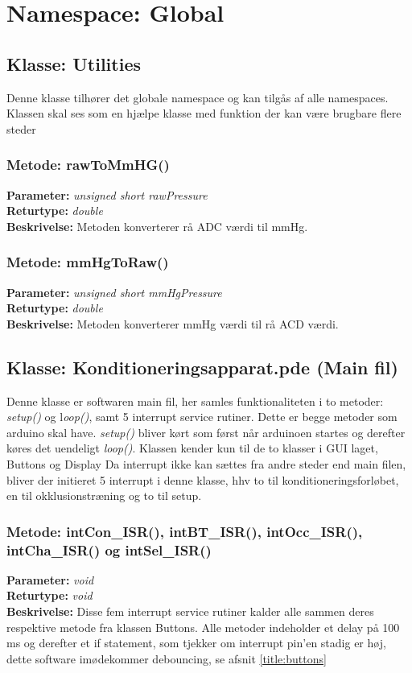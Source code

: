 \section{Namespace: Global}

\subsection{Klasse: Utilities}
Denne klasse tilhører det globale namespace og kan tilgås af alle namespaces. Klassen skal ses som en hjælpe klasse med funktion der kan være brugbare flere steder

\subsubsection{Metode: rawToMmHG()}
\textbf{Parameter: } \textit{unsigned short rawPressure}
\\ \textbf{Returtype: } \textit{double}
\\ \textbf{Beskrivelse: } Metoden konverterer rå ADC værdi til mmHg.

\subsubsection{Metode: mmHgToRaw()}
\textbf{Parameter: } \textit{unsigned short mmHgPressure}
\\ \textbf{Returtype: } \textit{double}
\\ \textbf{Beskrivelse: } Metoden konverterer mmHg værdi til rå ACD værdi.

\subsection{Klasse: Konditioneringsapparat.pde (Main fil)}
Denne klasse er softwaren main fil, her samles funktionaliteten i to metoder: \textit{setup()} og l\textit{oop()}, samt 5 interrupt service rutiner. Dette er begge metoder som arduino skal have. \textit{setup()} bliver kørt som først når arduinoen startes og derefter køres det uendeligt \textit{loop()}. Klassen kender kun til de to klasser i GUI laget, Buttons og Display
Da interrupt ikke kan sættes fra andre steder end main filen, bliver der initieret 5 interrupt i denne klasse, hhv to til konditioneringsforløbet, en til okklusionstræning og to til setup.

\subsubsection{Metode: intCon\_ISR(), intBT\_ISR(), intOcc\_ISR(), intCha\_ISR() og intSel\_ISR()}
\textbf{Parameter: } \textit{void}
\\ \textbf{Returtype: } \textit{void}
\\ \textbf{Beskrivelse: } Disse fem interrupt service rutiner kalder alle sammen deres respektive metode fra klassen Buttons. Alle metoder indeholder et delay på 100 ms og derefter et if statement, som tjekker om interrupt pin’en stadig er høj, dette software imødekommer debouncing, se afsnit \ref{title:buttons}



